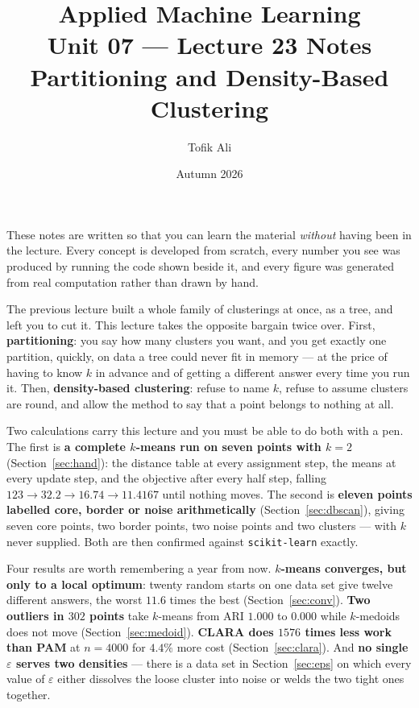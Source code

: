 \documentclass[11pt]{article}
\title{Applied Machine Learning\\Unit 07 --- Lecture 23 Notes\\
       Partitioning and Density-Based Clustering}
\author{Tofik Ali}
\date{Autumn 2026}
\begin{document}
\maketitle

\begin{keyidea}
These notes are written so that you can learn the material \emph{without}
having been in the lecture. Every concept is developed from scratch, every
number you see was produced by running the code shown beside it, and every
figure was generated from real computation rather than drawn by hand.

The previous lecture built a whole family of clusterings at once, as a tree,
and left you to cut it. This lecture takes the opposite bargain twice over.
First, \textbf{partitioning}: you say how many clusters you want, and you get
exactly one partition, quickly, on data a tree could never fit in memory ---
at the price of having to know $k$ in advance and of getting a different
answer every time you run it. Then, \textbf{density-based clustering}: refuse
to name $k$, refuse to assume clusters are round, and allow the method to
say that a point belongs to nothing at all.

Two calculations carry this lecture and you must be able to do both with a
pen. The first is \textbf{a complete $k$-means run on seven points with
$k = 2$} (Section~\ref{sec:hand}): the distance table at every assignment
step, the means at every update step, and the objective after every half
step, falling $123 \to 32.2 \to 16.74 \to 11.4167$ until nothing moves. The
second is \textbf{eleven points labelled core, border or noise
arithmetically} (Section~\ref{sec:dbscan}), giving seven core points, two
border points, two noise points and two clusters --- with $k$ never supplied.
Both are then confirmed against \texttt{scikit-learn} exactly.

Four results are worth remembering a year from now. \textbf{$k$-means
converges, but only to a local optimum}: twenty random starts on one data set
give twelve different answers, the worst $11.6$ times the best
(Section~\ref{sec:conv}). \textbf{Two outliers in $302$ points} take
$k$-means from ARI $1.000$ to $0.000$ while $k$-medoids does not move
(Section~\ref{sec:medoid}). \textbf{CLARA does $1576$ times less work than
PAM} at $n = 4000$ for $4.4\%$ more cost (Section~\ref{sec:clara}). And
\textbf{no single $\varepsilon$ serves two densities} --- there is a data set
in Section~\ref{sec:eps} on which every value of $\varepsilon$ either
dissolves the loose cluster into noise or welds the two tight ones together.
\end{keyidea}
\end{document}
